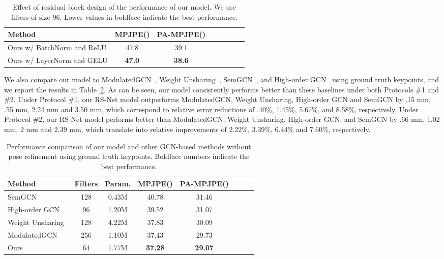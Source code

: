 \documentclass[10pt,journal]{IEEEtran}
\begin{document}
\begin{table}[!htb]
\caption{Effect of residual block design of the performance of our model. We use filters of size 96. Lower values in boldface indicate the best performance.}
\small
\setlength{\tabcolsep}{2.5pt}
\medskip
\centering
\begin{tabular}{l*{7}{c}}
\toprule
Method  & MPJPE() & PA-MPJPE()\\
\midrule
Ours w/ BatchNorm and ReLU & 47.8 & 39.1 \\
Ours w/ LayerNorm and GELU   & \textbf{47.0} & \textbf{38.6}  \\
\bottomrule			
\end{tabular}
\label{Tab:LayerNormAndGELU}
\end{table}

We also compare our model to ModulatedGCN~\cite{zou2021modulated}, Weight Unsharing~\cite{liu2020comprehensive}, SemGCN~\cite{zhao2019semantic}, and High-order GCN~\cite{zou2020high} using ground truth keypoints, and we report the results in Table~\ref{Tab:baseline}. As can be seen, our model consistently performs better than these baselines under both Protocols \#1 and \#2. Under Protocol \#1, our RS-Net model outperforms ModulatedGCN, Weight Unsharing, High-order GCN and SemGCN by .15 mm, .55 mm, 2.24 mm and 3.50 mm, which correspond to relative error reductions of .40\%, 1.45\%, 5.67\%, and 8.58\%, respectively. Under Protocol \#2, our RS-Net model performs better than ModulatedGCN, Weight Unsharing, High-order GCN, and SemGCN by .66 mm, 1.02 mm, 2 mm and 2.39 mm, which translate into relative improvements of 2.22\%, 3.39\%, 6.44\% and 7.60\%, respectively.

\begin{table}[!htb]
\caption{Performance comparison of our model and other GCN-based methods without pose refinement using ground truth keypoints. Boldface numbers indicate the best performance.}
\small
\setlength{\tabcolsep}{2.5pt}
\medskip
\centering
\begin{tabular}{l*{7}{c}}
\toprule
Method & Filters & Param. & MPJPE() & PA-MPJPE()\\
\midrule
SemGCN~\cite{zhao2019semantic} & 128 & 0.43M & 40.78 & 31.46 \\
High-order GCN~\cite{zou2020high}  & 96 & 1.20M & 39.52 &31.07 \\
Weight Unsharing~\cite{liu2020comprehensive} & 128 & 4.22M & 37.83 & 30.09  \\
ModulatedGCN~\cite{zou2021modulated} & 256 & 1.10M & 37.43 & 29.73 \\
\midrule
Ours & 64 & 1.77M & \textbf{37.28} & \textbf{29.07} \\


\bottomrule
\end{tabular}
\label{Tab:baseline}
\end{table}
\end{document}
